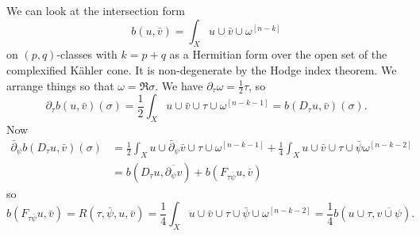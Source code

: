 \documentclass[11pt]{article}
\theoremstyle{definition}
\def\^#1{^{[#1]}}
\def\ov#1{\overline{#1}}
\begin{document}
We can look at the intersection form
\[
b(u,\bar v) = \int_X u \cup \bar v \cup \omega\^{n-k}
\]
on $(p,q)$-classes with $k = p+q$ as a Hermitian form over the open set of the complexified K\"ahler cone.
It is non-degenerate by the Hodge index theorem.
We arrange things so that $\omega = \Re \sigma$.
We have $\partial_\tau \omega = \frac12 \tau$, so
\[
\partial_\tau b(u, \bar v)(\sigma)
= \frac12 \int_X u \cup \bar v \cup \tau \cup \omega\^{n-k-1}
= b(D_\tau u, \bar v)(\sigma).
\]
Now
\begin{align*}
\bar\partial_\psi b(D_\tau u, \bar v)(\sigma)
&= \frac12 \int_X u \cup \bar\partial_\psi \bar v \cup \tau \cup \omega\^{n-k-1}
+ \frac14 \int_X u \cup \bar v \cup \tau \cup \bar\psi \omega\^{n-k-2}
\\
&= b(D_\tau u, \ov{\partial_\psi v})
+ b(F_{\tau\bar\psi} u, \bar v)
\end{align*}
so
\[
b(F_{\tau\bar\psi} u, \bar v)
= R(\tau, \bar\psi, u, \bar v)
= \frac14 \int_X u \cup \bar v \cup \tau \cup \bar\psi \cup \omega\^{n-k-2}
= \frac14 b(u \cup \tau, \ov{v \cup \psi}).
\]





\end{document}
